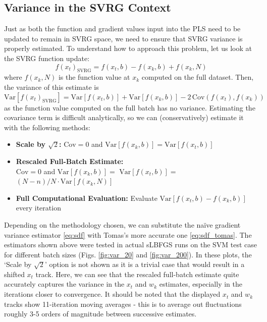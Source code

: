 \documentclass{article}
\begin{document}
\subsection{Variance in the SVRG Context}
Just as both the function and gradient values input into the PLS need to be updated to remain in SVRG space, we need to ensure that SVRG variance is properly estimated. To understand how to approach this problem, let us look at the SVRG function update:
\[ f(x_t)_{\text{SVRG}} = f(x_t, b) - f(x_k, b) + f(x_k, N) \]
where $f(x_k, N)$ is the function value at $x_k$ computed on the full dataset. Then, the variance of this estimate is
\begin{equation}
\label{eq:svrg_var}
\text{Var}[f(x_t)_{\text{SVRG}}] = \text{Var}[f(x_t,b)] + \text{Var}[f(x_k, b)] - 2\,\text{Cov}(f(x_t),f(x_k))
\end{equation}
as the function value computed on the full batch has no variance. Estimating the covariance term is difficult analytically, so we can (conservatively) estimate it with the following methods:
\begin{itemize}
	\item \textbf{Scale by $\sqrt{2}$:} $\text{Cov}=0$ and $\text{Var}[f(x_k, b)]=\text{Var}[f(x_t, b)]$
	\item \textbf{Rescaled Full-Batch Estimate:} \\ $\text{Cov}=0$ and $\text{Var}[f(x_k, b)]=$ $\text{Var}[f(x_t, b)] =$ $(N-n)/N\cdot\text{Var}[f(x_k, N)]$
	\item \textbf{Full Computational Evaluation:} Evaluate $\text{Var}[f(x_t, b) - f(x_k,b)]$ every iteration
\end{itemize}
Depending on the methodology chosen, we can substitute the naïve gradient variance estimator \eqref{eq:sdf} with Tomas's more accurate one \eqref{eq:sdf_tomas}. The estimators shown above were tested in actual sLBFGS runs on the SVM test case for different batch sizes (Figs. \ref{fig:var_20} and \ref{fig:var_200}). In these plots, the `Scale by $\sqrt{2}$' option is not shown as it is a trivial case that would result in a shifted $x_t$ track. Here, we can see that the rescaled full-batch estimate quite accurately captures the variance in the $x_t$ and $w_k$ estimates, especially in the iterations closer to convergence. It should be noted that the displayed $x_t$ and $w_k$ tracks show 11-iteration moving averages - this is to average out fluctuations roughly 3-5 orders of magnitude between successive estimates.
\end{document}
